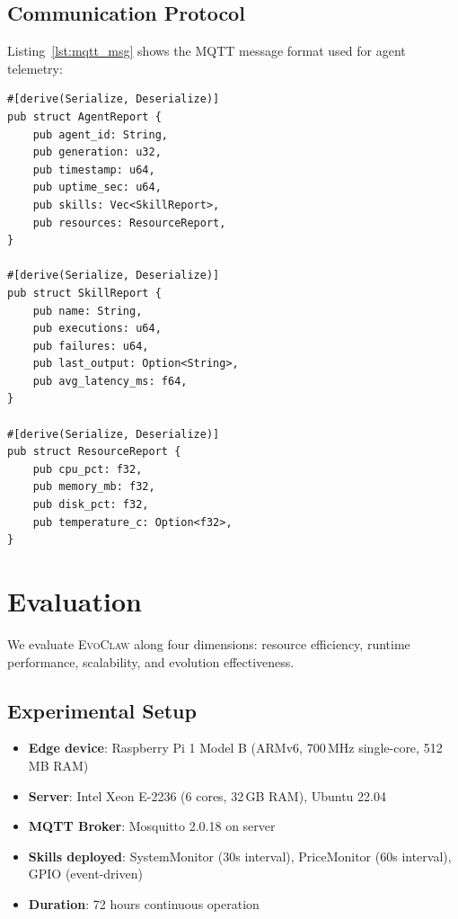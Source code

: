 \documentclass{article}
\newcommand{\evoclaw}{\textsc{EvoClaw}}
\begin{document}
\subsection{Communication Protocol}

Listing~\ref{lst:mqtt_msg} shows the MQTT message format used for agent telemetry:

\begin{lstlisting}[style=rustcode, caption={MQTT telemetry message structure.}, label={lst:mqtt_msg}]
#[derive(Serialize, Deserialize)]
pub struct AgentReport {
    pub agent_id: String,
    pub generation: u32,
    pub timestamp: u64,
    pub uptime_sec: u64,
    pub skills: Vec<SkillReport>,
    pub resources: ResourceReport,
}

#[derive(Serialize, Deserialize)]
pub struct SkillReport {
    pub name: String,
    pub executions: u64,
    pub failures: u64,
    pub last_output: Option<String>,
    pub avg_latency_ms: f64,
}

#[derive(Serialize, Deserialize)]
pub struct ResourceReport {
    pub cpu_pct: f32,
    pub memory_mb: f32,
    pub disk_pct: f32,
    pub temperature_c: Option<f32>,
}
\end{lstlisting}



\section{Evaluation}
\label{sec:evaluation}

We evaluate \evoclaw{} along four dimensions: resource efficiency, runtime performance, scalability, and evolution effectiveness.

\subsection{Experimental Setup}

\begin{itemize}[leftmargin=*]
    \item \textbf{Edge device}: Raspberry Pi 1 Model B (ARMv6, 700\,MHz single-core, 512\,MB RAM)
    \item \textbf{Server}: Intel Xeon E-2236 (6 cores, 32\,GB RAM), Ubuntu 22.04
    \item \textbf{MQTT Broker}: Mosquitto 2.0.18 on server
    \item \textbf{Skills deployed}: SystemMonitor (30s interval), PriceMonitor (60s interval), GPIO (event-driven)
    \item \textbf{Duration}: 72 hours continuous operation
\end{itemize}
\end{document}
